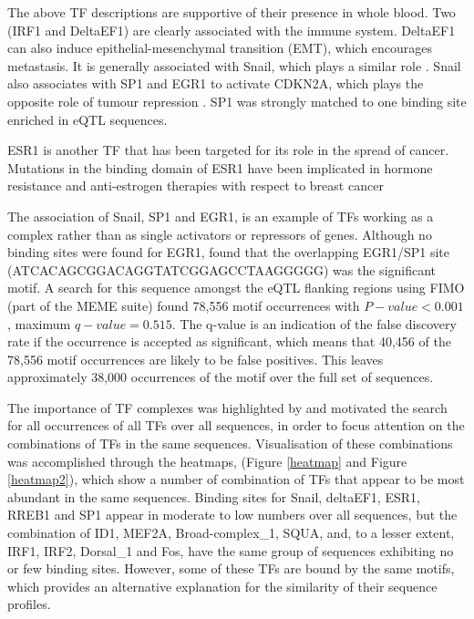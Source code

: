 \documentclass[12pt]{article}
\begin{document}
The above TF descriptions are supportive of their presence in whole blood. Two (IRF1 and DeltaEF1) are clearly associated with the immune system. DeltaEF1 can also induce epithelial-mesenchymal transition (EMT), which encourages metastasis. It is generally associated with Snail, which plays a similar role \citep{Bourcy2018}. Snail also associates with SP1 and EGR1 to activate CDKN2A, which plays the opposite role of tumour repression \citep{Hu2010}. SP1 was strongly matched to one binding site enriched in eQTL sequences.

ESR1 is another TF that has been targeted for its role in the spread of cancer. Mutations in the binding domain of ESR1 have been implicated in hormone resistance and anti-estrogen therapies with respect to breast cancer \citep{Griffith2017}

The association of Snail, SP1 and EGR1, is an example of TFs working as a complex rather than as single activators or repressors of genes. Although no binding sites were found for EGR1, \citet{Hu2010} found that the overlapping EGR1/SP1 site (ATCACAGCGGACAGGTATCGGAGCCTAAGGGGG) was the significant motif. A search for this sequence amongst the eQTL flanking regions using FIMO (part of the MEME suite) \citep{Grant2011} found 78,556 motif occurrences with  $P-value < 0.001$, maximum $q-value = 0.515$. The q-value is an indication of the false discovery rate if the occurrence is accepted as significant, which means that 40,456 of the 78,556 motif occurrences are likely to be false positives. This leaves approximately 38,000 occurrences of the motif over the full set of sequences.

The importance of TF complexes was highlighted by \citet{Jolma2015} and motivated the search for all occurrences of all TFs over all sequences, in order to focus attention on the combinations of TFs in the same sequences. Visualisation of these combinations was accomplished through the heatmaps, (Figure \ref{heatmap} and Figure \ref{heatmap2}), which show a number of combination of TFs that appear to be most abundant in the same sequences. Binding sites for Snail, deltaEF1,  ESR1, RREB1 and SP1 appear in moderate to low numbers over all sequences, but the combination of ID1, MEF2A, Broad-complex{\_}1, SQUA, and, to a lesser extent, IRF1, IRF2, Dorsal{\_}1 and Fos, have the same group of sequences exhibiting no or few binding sites. However, some of these TFs are bound by the same motifs, which provides an alternative explanation for the similarity of their sequence profiles.
\end{document}
